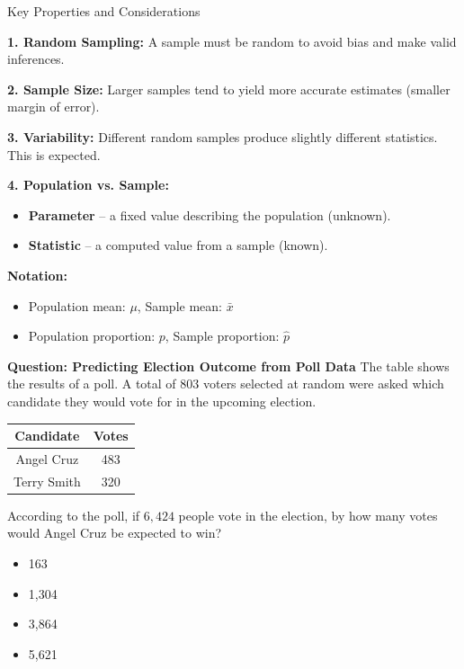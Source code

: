 \documentclass{beamer}
\begin{document}
\begin{frame}{Key Properties and Considerations}
\small

\textbf{1. Random Sampling:}  
A sample must be random to avoid bias and make valid inferences.

\textbf{2. Sample Size:}  
Larger samples tend to yield more accurate estimates (smaller margin of error).

\textbf{3. Variability:}  
Different random samples produce slightly different statistics. This is expected.

\textbf{4. Population vs. Sample:}
\begin{itemize}
    \item \textbf{Parameter} – a fixed value describing the population (unknown).
    \item \textbf{Statistic} – a computed value from a sample (known).
\end{itemize}

\textbf{Notation:}
\begin{itemize}
    \item Population mean: $\mu$, Sample mean: $\bar{x}$
    \item Population proportion: $p$, Sample proportion: $\hat{p}$
\end{itemize}

\end{frame}


\begin{frame}{\textbf{Question: Predicting Election Outcome from Poll Data}}
The table shows the results of a poll. A total of \( 803 \) voters selected at random were asked which candidate they would vote for in the upcoming election.

\begin{center}
\begin{tabular}{|c|c|}
\hline
\textbf{Candidate} & \textbf{Votes} \\
\hline
Angel Cruz & 483 \\
Terry Smith & 320 \\
\hline
\end{tabular}
\end{center}

According to the poll, if \( 6{,}424 \) people vote in the election, by how many votes would Angel Cruz be expected to win?

\begin{itemize}
    \item[A.] 163
    \item[B.] 1,304
    \item[C.] 3,864
    \item[D.] 5,621
\end{itemize}
\end{frame}
\end{document}
